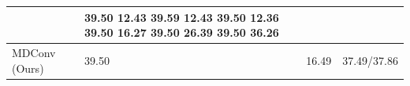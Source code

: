 \begin{tabular}{llll}
\toprule
 & 39.50 12.43 39.59 12.43 39.50 12.36 39.50 16.27 39.50 26.39 39.50 36.26 &  &  \\
\midrule
MDConv (Ours) & 39.50 & 16.49 & 37.49/37.86 \\
\bottomrule
\end{tabular}

